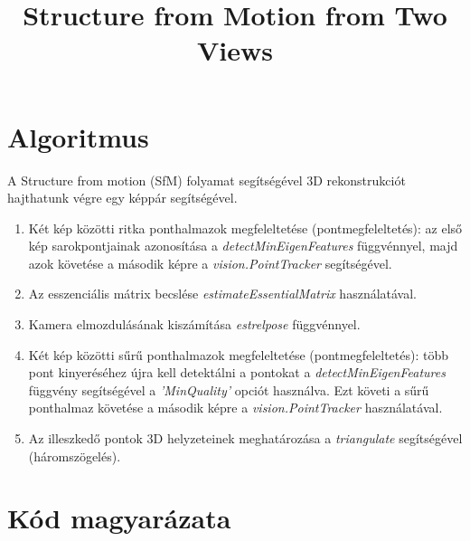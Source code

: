 \documentclass[12pt]{report}
\title{Structure from Motion from Two Views}
\date{}
\begin{document}
    \maketitle

    \chapter{Algoritmus}
    A Structure from motion (SfM) folyamat segítségével 3D rekonstrukciót hajthatunk végre egy képpár segítségével.

    \begin{enumerate}
        \item Két kép közötti ritka ponthalmazok megfeleltetése (pontmegfeleltetés): az első kép sarokpontjainak azonosítása a \textit{detectMinEigenFeatures} függvénnyel, majd azok követése a második képre a \textit{vision.PointTracker} segítségével.
        \item Az esszenciális mátrix becslése \textit{estimateEssentialMatrix} használatával.
        \item Kamera elmozdulásának kiszámítása \textit{estrelpose} függvénnyel.
        \item Két kép közötti sűrű ponthalmazok megfeleltetése (pontmegfeleltetés): több pont kinyeréséhez újra kell detektálni a pontokat a \textit{detectMinEigenFeatures} függvény segítségével a \textit{'MinQuality'} opciót használva. Ezt követi a sűrű ponthalmaz követése a második képre a \textit{vision.PointTracker} használatával.
        \item Az illeszkedő pontok 3D helyzeteinek meghatározása a \textit{triangulate} segítségével (háromszögelés).
    \end{enumerate}    

    \chapter{Kód magyarázata}
\end{document}
